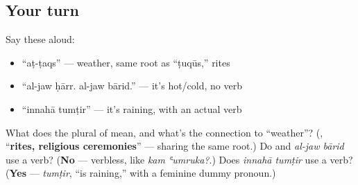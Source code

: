 \subsection*{Your turn}
Say these aloud:

\begin{itemize}
\raggedright
  \item \textquotedblleft{}aṭ-ṭaqs\textquotedblright{} — weather, same root as \textquotedblleft{}ṭuqūs,\textquotedblright{} rites
  \item \textquotedblleft{}al-jaw ḥārr. al-jaw bārid.\textquotedblright{} — it's hot/cold, no verb
  \item \textquotedblleft{}innahā tumṭir\textquotedblright{} — it's raining, with an actual verb
\end{itemize}

\begin{tcolorbox}[breakable,colback=teal!4,colframe=teal!35!black,title={Before you move on}]
What does the plural of \textbf{} mean, and what's the connection to \textquotedblleft{}weather\textquotedblright{}? (\textbf{}, \textquotedblleft{}\textbf{rites, religious ceremonies}\textquotedblright{} — sharing the same root.) Do \textbf{ } and \emph{al-jaw bārid} use a verb? (\textbf{No} — verbless, like \emph{kam ʿumruka?}.) Does \emph{innahā tumṭir} use a verb? (\textbf{Yes} — \emph{tumṭir}, \textquotedblleft{}is raining,\textquotedblright{} with a feminine dummy pronoun.)
\end{tcolorbox}
